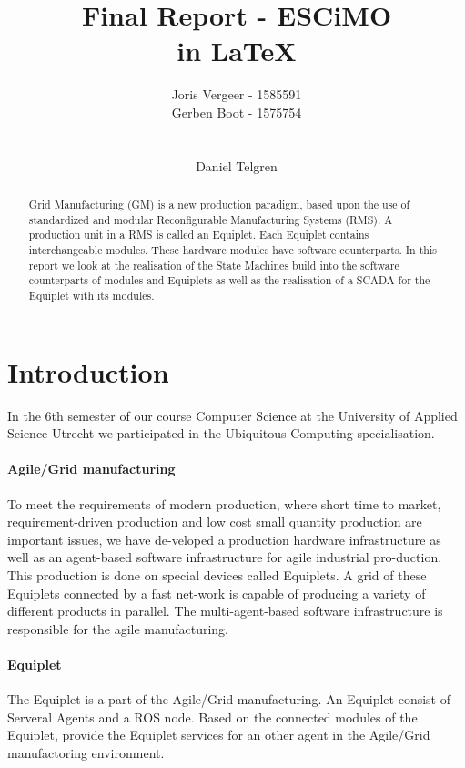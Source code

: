 \documentclass[12pt,a4paper]{report}
\title{
Final Report - ESCiMO \\
in \LaTeX{}
}
\author{
Joris Vergeer - 1585591\\
Gerben Boot - 1575754\\
\\
\\
Daniel Telgren
}
\begin{document}
\maketitle

\begin{abstract}
Grid Manufacturing (GM) is a new production paradigm, based upon the use of standardized and modular Reconfigurable Manufacturing Systems (RMS).\cite{SICE13}
A production unit in a RMS is called an Equiplet.
Each Equiplet contains interchangeable modules. 
These hardware modules have software counterparts.
In this report we look at the realisation of the State Machines build into the software counterparts of modules and Equiplets as well as the realisation of a SCADA for the Equiplet with its modules.
\end{abstract}

\tableofcontents


\chapter{Introduction}
In the 6th semester of our course Computer Science at the University of Applied Science Utrecht we participated in the Ubiquitous Computing specialisation.

\subsubsection{Agile/Grid manufacturing}
To meet the requirements of modern production, where short time to market, requirement-driven production and low cost small quantity production are important issues, we have de-veloped a production hardware infrastructure as well as an
agent-based software infrastructure for agile industrial pro-duction. This production is done on special devices called Equiplets. A grid of these Equiplets connected by a fast net-work is capable of producing a variety of different products
in parallel. The multi-agent-based software infrastructure is responsible for the agile manufacturing.\cite{Paper70}

\subsubsection{Equiplet}
The Equiplet is a part of the Agile/Grid manufacturing. An Equiplet consist of Serveral Agents and a ROS node. Based on the connected modules of the Equiplet, provide the Equiplet services for an other agent in the Agile/Grid manufactoring environment. 
\end{document}
